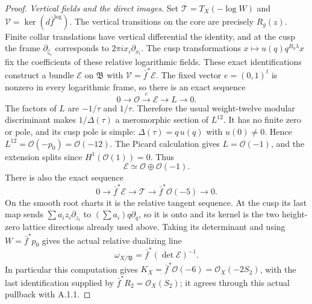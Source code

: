 \begin{proof}
\emph{Vertical fields and the direct images.}
Set $\mathcal T=T_X(-\log W)$ and
$\mathcal V=\ker(d\bar f^{\log})$.
The vertical transitions on the core are precisely $R_g(z)$.
Finite collar translations have vertical differential the identity,
and at the cusp the frame $\partial_{\zeta_i}$ corresponds to
$2\pi i x_i\partial_{x_i}$. The cusp transformations
$x\mapsto u(q)q^{B_0\lambda}x$ fix the coefficients of these
relative logarithmic fields. These exact identifications construct
a bundle $\mathcal E$ on $\mathfrak B$ with
$\mathcal V=\bar f^*\mathcal E$.
The fixed vector $e=(0,1)^t$ is nonzero in every logarithmic frame,
so there is an exact sequence
\[
 0\longrightarrow\mathcal O\xrightarrow{e}\mathcal E
 \longrightarrow L\longrightarrow0.
\]
The factors of $L$ are $-1/\tau$ and $1/\tau$. Therefore the usual
weight-twelve modular discriminant makes $1/\Delta(\tau)$ a
meromorphic section of $L^{12}$. It has no finite zero or pole,
and its cusp pole is simple: $\Delta(\tau)=q\,u(q)$ with
$u(0)\ne0$. Hence $L^{12}=\mathcal O(-p_0)=\mathcal O(-12)$.
The Picard calculation gives $L=\mathcal O(-1)$, and the extension
splits since $H^1(\mathcal O(1))=0$. Thus
\[
 \mathcal E\simeq\mathcal O\oplus\mathcal O(-1).
\]
There is also the exact sequence
\begin{equation}\label{fam:eq:ab-log-tangent}
 0\longrightarrow\bar f^*\mathcal E\longrightarrow\mathcal T
 \longrightarrow\bar f^*\mathcal O(-5)\longrightarrow0.
\end{equation}
On the smooth root charts it is the relative tangent sequence. At the
cusp its last map sends $\sum a_i z_i\partial_{z_i}$ to
$(\sum a_i)q\partial_q$, so it is onto and its kernel is the
two height-zero lattice directions already used above. Taking its
determinant and using $W=\bar f^*p_0$ gives the actual relative
dualizing line
\begin{equation}\label{fam:eq:ab-relative-dualizing}
 \omega_{X/\mathfrak B}=\bar f^*(\det\mathcal E)^{-1}.
\end{equation}
In particular this computation gives
$K_X=\bar f^*\mathcal O(-6)=\mathcal O_X(-2S_2)$, with the last
identification supplied by $\bar f^*R_2=\mathcal O_X(S_2)$;
it agrees through this actual pullback with A.1.1.


\end{proof}

